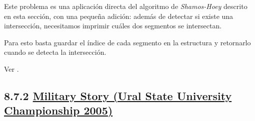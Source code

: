 Este problema es una aplicación directa del algoritmo de \textit{Shamos-Hoey} descrito en esta sección, con una pequeña adición: además de detectar si existe una intersección, necesitamos imprimir cuáles dos segmentos se intersectan.
 
Para esto basta guardar el índice de cada segmento en la
estructura y retornarlo cuando se detecta la intersección.
 
Ver .

\subsection*{8.7.2 \href{https://acm.timus.ru/problem.aspx?space=1&num=1418}{Military Story (Ural State University Championship 2005)}}
